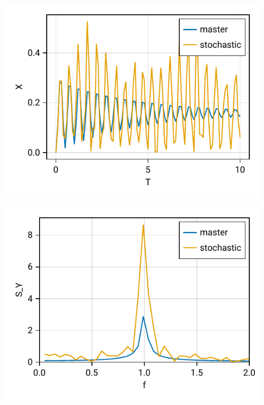 \documentclass{beamer}
\begin{document}
\begin{frame}{}
	\centering
	\includegraphics{figures/05 time evolution.pdf}
\end{frame}

\begin{frame}{}
	\centering
	\includegraphics{figures/05 frequency.pdf}
\end{frame}
\end{document}

